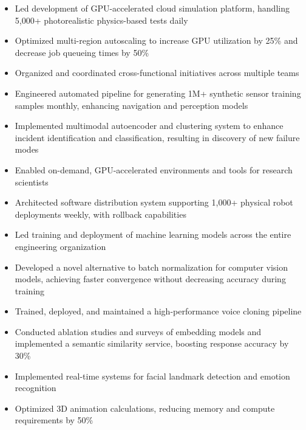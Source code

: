 \documentclass{my_cv}
\begin{document}
\begin{adjustwidth}{2em}{0em}

\begin{itemize}
    \item Led development of GPU-accelerated cloud simulation platform, handling 5,000+ photorealistic physics-based tests daily
\item Optimized multi-region autoscaling to increase GPU utilization by 25\% and decrease job queueing times by 50\%
\item Organized and coordinated cross-functional initiatives across multiple teams
\item Engineered automated pipeline for generating 1M+ synthetic sensor training samples monthly, enhancing navigation and perception models
\item Implemented multimodal autoencoder and clustering system to enhance incident identification and classification, resulting in discovery of new failure modes
\item Enabled on-demand, GPU-accelerated environments and tools for research scientists
\item Architected software distribution system supporting 1,000+ physical robot deployments weekly, with rollback capabilities
\end{itemize}
\vspace{0.5em}

\begin{adjustwidth}{1em}{0em}

\begin{itemize}
    \item Led training and deployment of machine learning models across the entire engineering organization
\item Developed a novel alternative to batch normalization for computer vision models, achieving faster convergence without decreasing accuracy during training
\item Trained, deployed, and maintained a high-performance voice cloning pipeline
\item Conducted ablation studies and surveys of embedding models and implemented a semantic similarity service, boosting response accuracy by 30\%
\item Implemented real-time systems for facial landmark detection and emotion recognition
\item Optimized 3D animation calculations, reducing memory and compute requirements by 50\%
\end{itemize}
\end{adjustwidth}


\end{adjustwidth}
\end{document}
